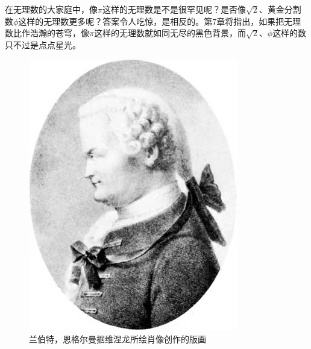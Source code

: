 \documentclass[b5paper]{ctexart}
\begin{document}
在无理数的大家庭中，像$\pi$这样的无理数是不是很罕见呢？是否像$\sqrt{2}$、黄金分割数$\phi$这样的无理数更多呢？答案令人吃惊，是相反的。第7章将指出，如果把无理数比作浩瀚的苍穹，像$\pi$这样的无理数就如同无尽的黑色背景，而$\sqrt{2}$、$\phi$这样的数只不过是点点星光。

\begin{figure}[htbp]
 \centering
 \includegraphics[scale=0.33]{img/Lambert}
 \caption{兰伯特，恩格尔曼据维涅龙所绘肖像创作的版画}
 \label{fig:lambert}
\end{figure}
\end{document}
